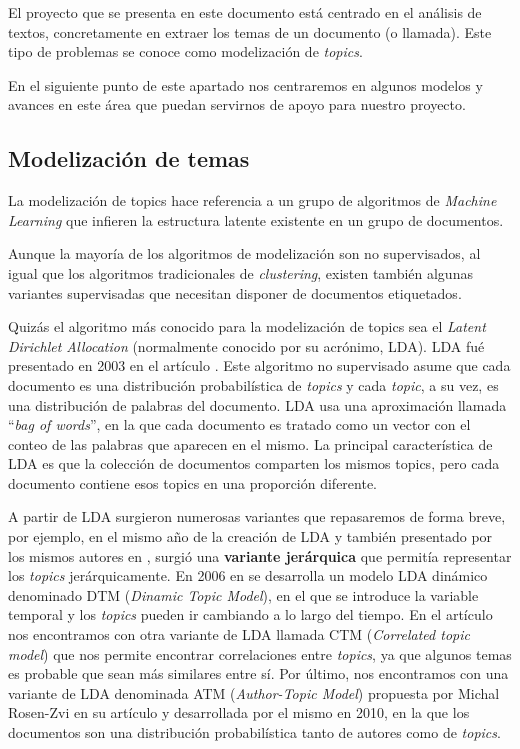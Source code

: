 El proyecto que se presenta en este documento está centrado en el análisis de textos, concretamente en extraer los temas de un documento (o llamada). Este tipo de problemas se conoce como modelización de \textit{topics}. 

En el siguiente punto de este apartado nos centraremos en algunos modelos y avances en este área que puedan servirnos de apoyo para nuestro proyecto. 


\subsection{Modelización de temas}
La modelización de topics hace referencia a un grupo de algoritmos de \textit{Machine Learning} que infieren la estructura latente existente en un grupo de documentos. 

Aunque la mayoría de los algoritmos de modelización son no supervisados, al igual que los algoritmos tradicionales de \textit{clustering}, existen también algunas variantes supervisadas que necesitan disponer de documentos etiquetados. 

Quizás el algoritmo más conocido para la modelización de topics sea el \textit{Latent Dirichlet Allocation} (normalmente conocido por su acrónimo, LDA). LDA fué presentado en 2003 en el artículo \cite{Blei_LDA}. Este algoritmo no supervisado asume que cada documento es una distribución probabilística de \textit{topics} y cada \textit{topic}, a su vez, es una distribución de palabras del documento. LDA usa una aproximación llamada ``\textit{bag of words}'', en la que cada documento es tratado como un vector con el conteo de las palabras que aparecen en el mismo. La principal característica de LDA es que la colección de documentos comparten los mismos topics, pero cada documento contiene esos topics en una proporción diferente. 


A partir de LDA surgieron numerosas variantes que repasaremos de forma breve, por ejemplo, en el mismo año de la creación de LDA y también presentado por los mismos autores en \cite{Blei_HTM}, surgió una \textbf{variante jerárquica} que permitía representar los \textit{topics} jerárquicamente. En 2006 en \cite{Blei_DTM} se desarrolla un modelo LDA dinámico denominado DTM (\textit{Dinamic Topic Model}), en el que se introduce la variable temporal y los \textit{topics} pueden ir cambiando a lo largo del tiempo. En el artículo \cite{Blei_CTM} nos encontramos con otra variante de LDA llamada CTM (\textit{Correlated topic model}) que nos permite encontrar correlaciones entre \textit{topics}, ya que algunos temas es probable que sean más similares entre sí. Por último, nos encontramos con una variante de LDA denominada ATM (\textit{Author-Topic Model}) propuesta  por	Michal Rosen-Zvi en su artículo \cite{Rosen-Zvi_AMA_2010}  y desarrollada por el mismo en 2010, en la que los documentos son una distribución probabilística tanto de autores como de \textit{topics}.    


